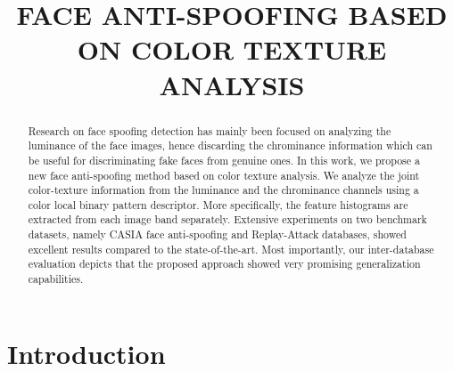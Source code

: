 \documentclass{article}
\title{FACE ANTI-SPOOFING BASED ON COLOR TEXTURE ANALYSIS}
\begin{document}
\maketitle
\vspace{-6mm}
\begin{abstract}
Research on face spoofing detection has mainly been focused on analyzing the luminance of the face images, hence discarding the chrominance information which can be useful for discriminating fake faces from genuine ones. In this work, we propose a new face anti-spoofing method based on color texture analysis. We analyze the joint color-texture information from the luminance and the chrominance channels using a color local binary pattern descriptor. More specifically, the feature histograms are extracted from each image band separately. Extensive experiments on two benchmark datasets, namely CASIA face anti-spoofing and Replay-Attack databases, showed excellent results compared to the state-of-the-art. Most importantly, our inter-database evaluation depicts that the proposed approach showed very promising generalization capabilities.
\end{abstract}

\vspace{-2mm}
\section{Introduction}
\vspace{-2mm}
\label{sec:intro}
\end{document}
